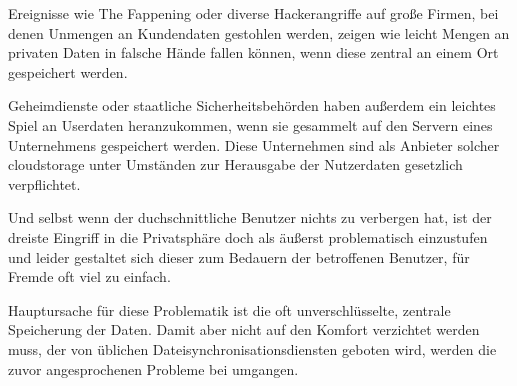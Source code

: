 Ereignisse wie \glqq{} The Fappening \grqq{} oder diverse Hackerangriffe auf große Firmen, bei
denen Unmengen an Kundendaten gestohlen werden, zeigen wie leicht Mengen an
privaten Daten in falsche Hände fallen können, wenn diese zentral an einem Ort
gespeichert werden.

Geheimdienste oder staatliche Sicherheitsbehörden haben außerdem ein leichtes
Spiel an Userdaten heranzukommen, wenn sie gesammelt auf den Servern eines
Unternehmens gespeichert werden. Diese Unternehmen sind als Anbieter solcher
\gls{cloudstorage} unter Umständen zur Herausgabe der Nutzerdaten gesetzlich
verpflichtet.

Und selbst wenn der duchschnittliche Benutzer nichts zu verbergen hat, ist der
dreiste Eingriff in die Privatsphäre doch als äußerst problematisch einzustufen
und leider gestaltet sich dieser zum Bedauern der betroffenen Benutzer, für
Fremde oft viel zu einfach.

Hauptursache für diese Problematik ist die oft unverschlüsselte, zentrale
Speicherung der Daten. Damit aber nicht auf den Komfort verzichtet werden muss,
der von üblichen Dateisynchronisationsdiensten geboten wird, werden die zuvor
angesprochenen Probleme bei \sblit umgangen.

